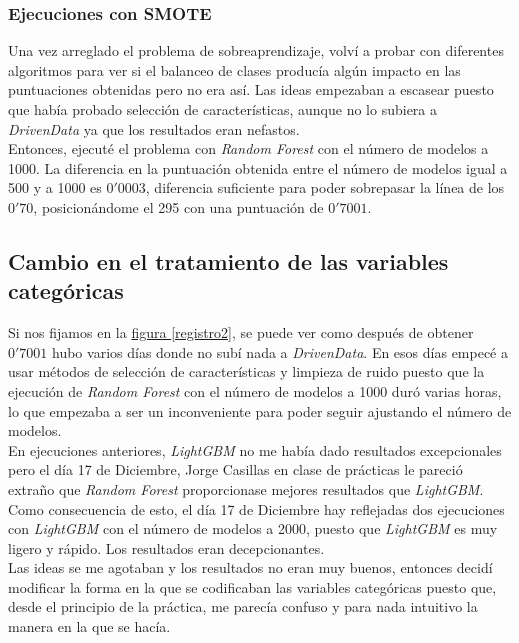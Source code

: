 \documentclass[paper=a4, fontsize=12pt]{article} %
\numberwithin{equation}{section} %
\numberwithin{figure}{section} %
\numberwithin{table}{section} %
\begin{document}
\subsubsection{Ejecuciones con SMOTE}
Una vez arreglado el problema de sobreaprendizaje, volví a probar con diferentes algoritmos para ver si el balanceo de clases producía algún impacto en las puntuaciones obtenidas pero no era así. Las ideas empezaban a escasear puesto que había probado selección de características, aunque no lo subiera a \textit{DrivenData} ya que los resultados eran nefastos. \\

Entonces, ejecuté el problema con \textit{Random Forest} con el número de modelos a 1000. La diferencia en la puntuación obtenida entre el número de modelos igual a 500 y a 1000 es $0'0003$, diferencia suficiente para poder sobrepasar la línea de los $0'70$, posicionándome el 295 con una puntuación de $0'7001$.

\subsection{Cambio en el tratamiento de las variables categóricas}
Si nos fijamos en la \hyperref[registro2]{figura \ref*{registro2}}, se puede ver como después de obtener $0'7001$ hubo varios días donde no subí nada a \textit{DrivenData}. En esos días empecé a usar métodos de selección de características y limpieza de ruido puesto que la ejecución de \textit{Random Forest} con el número de modelos a 1000 duró varias horas, lo que empezaba a ser un inconveniente para poder seguir ajustando el número de modelos.\\

En ejecuciones anteriores, \textit{LightGBM} no me había dado resultados excepcionales pero el día 17 de Diciembre, Jorge Casillas en clase de prácticas le pareció extraño que \textit{Random Forest} proporcionase mejores resultados que \textit{LightGBM}. Como consecuencia de esto, el día 17 de Diciembre hay reflejadas dos ejecuciones con \textit{LightGBM} con el número de modelos a 2000, puesto que \textit{LightGBM} es muy ligero y rápido. Los resultados eran decepcionantes. \\

Las ideas se me agotaban y los resultados no eran muy buenos, entonces decidí modificar la forma en la que se codificaban las variables categóricas puesto que, desde el principio de la práctica, me parecía confuso y para nada intuitivo la manera en la que se hacía. \\
\end{document}
